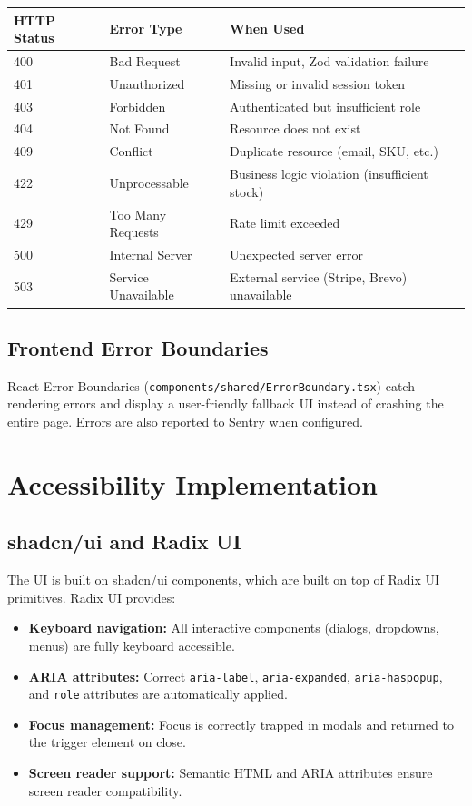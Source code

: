 \documentclass[12pt,a4paper]{report}
\begin{document}
\begin{center}
\begin{tabularx}{\textwidth}{llX}
  \toprule
  \textbf{HTTP Status} & \textbf{Error Type} & \textbf{When Used} \\
  \midrule
  400 & Bad Request       & Invalid input, Zod validation failure \\
  401 & Unauthorized      & Missing or invalid session token \\
  403 & Forbidden         & Authenticated but insufficient role \\
  404 & Not Found         & Resource does not exist \\
  409 & Conflict          & Duplicate resource (email, SKU, etc.) \\
  422 & Unprocessable     & Business logic violation (insufficient stock) \\
  429 & Too Many Requests & Rate limit exceeded \\
  500 & Internal Server   & Unexpected server error \\
  503 & Service Unavailable & External service (Stripe, Brevo) unavailable \\
  \bottomrule
\end{tabularx}
\end{center}

\subsection{Frontend Error Boundaries}

React Error Boundaries (\texttt{components/shared/ErrorBoundary.tsx}) catch rendering errors and display a user-friendly fallback UI instead of crashing the entire page. Errors are also reported to Sentry when configured.

\section{Accessibility Implementation}

\subsection{shadcn/ui and Radix UI}

The UI is built on shadcn/ui components, which are built on top of Radix UI primitives. Radix UI provides:
\begin{itemize}[leftmargin=1.5em]
  \item \textbf{Keyboard navigation:} All interactive components (dialogs, dropdowns, menus) are fully keyboard accessible.
  \item \textbf{ARIA attributes:} Correct \texttt{aria-label}, \texttt{aria-expanded}, \texttt{aria-haspopup}, and \texttt{role} attributes are automatically applied.
  \item \textbf{Focus management:} Focus is correctly trapped in modals and returned to the trigger element on close.
  \item \textbf{Screen reader support:} Semantic HTML and ARIA attributes ensure screen reader compatibility.
\end{itemize}
\end{document}
